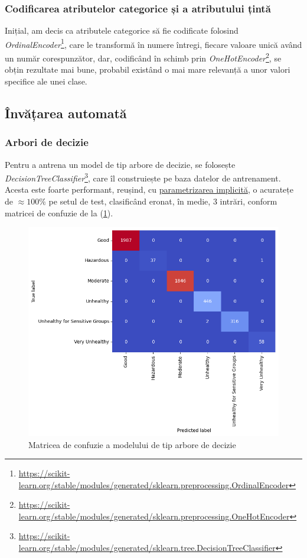 \documentclass{article}
\begin{document}
\subsubsection{Codificarea atributelor categorice și a atributului țintă}
Inițial, am decis ca atributele categorice să fie codificate folosind \textit{OrdinalEncoder}\footnote{
    \url{https://scikit-learn.org/stable/modules/generated/sklearn.preprocessing.OrdinalEncoder}
}, care le transformă în numere întregi, fiecare valoare unică având un număr
corespunzător, dar, codificând în schimb prin \textit{OneHotEncoder}\footnote{
    \url{https://scikit-learn.org/stable/modules/generated/sklearn.preprocessing.OneHotEncoder}
}, se obțin rezultate mai bune, probabil existând o mai mare relevanță a unor 
valori specifice ale unei clase. 

\newpage
\subsection{Învățarea automată}

\subsubsection{Arbori de decizie}
Pentru a antrena un model de tip arbore de decizie, se folosește
\textit{DecisionTreeClassifier}\footnote{
    \url{https://scikit-learn.org/stable/modules/generated/sklearn.tree.DecisionTreeClassifier}
}, care îl construiește pe baza datelor de antrenament. Acesta este foarte 
performant, reușind, cu \underline{parametrizarea implicită}, o acuratețe de
$\approx 100\%$ pe setul de test, clasificând eronat, în medie, 3 intrări, 
conform matricei de confuzie de la (\ref{fig:pol:dt_conf}).

\begin{figure}[ht]
    \centering
    \includegraphics[scale=0.5]{air_pollution/learning/decision_conf.png}
    \caption{Matricea de confuzie a modelului de tip arbore de decizie}
    \label{fig:pol:dt_conf}
\end{figure}
\end{document}
